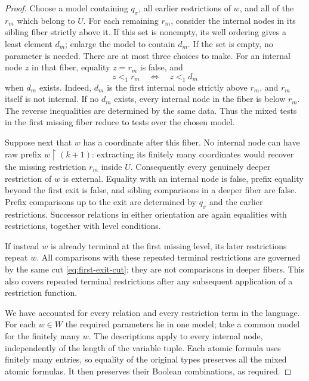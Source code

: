 \documentclass[11pt]{article}
\theoremstyle{definition}
\theoremstyle{remark}
\newcommand{\restr}{\mathbin{\upharpoonright}}
\begin{document}
\begin{proof}
Choose a model containing $q_\sigma$, all earlier restrictions of $w$,
and all of the $r_m$ which belong to $U$.  For each remaining $r_m$,
consider the internal nodes in its sibling fiber strictly above it.
If this set is nonempty, its well ordering gives a least element $d_m$;
enlarge the model to contain $d_m$.  If the set is empty, no parameter is
needed.  There are at most three choices to make.  For an internal node
$z$ in that fiber, equality $z=r_m$ is false, and
\begin{equation}\label{eq:first-exit-cut}
 z<_1r_m\quad\Longleftrightarrow\quad z<_1d_m
\end{equation}
when $d_m$ exists.  Indeed, $d_m$ is the first internal node strictly
above $r_m$, and $r_m$ itself is not internal.  If no $d_m$ exists, every
internal node in the fiber is below $r_m$.  The reverse inequalities are
determined by the same data.  Thus the mixed tests in the first missing
fiber reduce to tests over the chosen model.

Suppose next that $w$ has a coordinate after this fiber.  No internal node
can have raw prefix $w\restr(k+1)$: extracting its finitely many
coordinates would recover the missing restriction $r_m$ inside $U$.
Consequently every genuinely deeper restriction of $w$ is external.
Equality with an internal node is false, prefix equality beyond the first
exit is false, and sibling comparisons in a deeper fiber are false.
Prefix comparisons up to the exit are determined by $q_\sigma$ and the
earlier restrictions.  Successor relations in either
orientation are again equalities with restrictions, together with level
conditions.

If instead $w$ is already terminal at the first missing level, its later
restrictions repeat $w$.  All comparisons with these repeated terminal
restrictions are governed by the same cut \eqref{eq:first-exit-cut}; they
are not comparisons in deeper fibers.  This also covers repeated
terminal restrictions after any subsequent application of a restriction
function.

We have accounted for every relation and every restriction term in the
language.  For each $w\in W$ the required parameters lie in one model;
take a common model for the finitely many $w$.  The descriptions apply
to every internal node, independently of the length of the variable
tuple.  Each atomic formula uses finitely many entries, so equality of
the original types preserves all the mixed atomic formulas.  It then
preserves their Boolean combinations, as required.
\end{proof}
\end{document}
